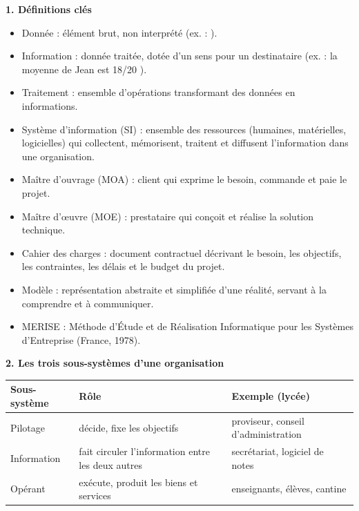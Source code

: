 \documentclass[11pt]{article}
\newcommand{\cle}[1]{{\popxbold\color{popdark}#1}}
\begin{document}
\begin{bilan}
\textbf{1. D\'efinitions cl\'es}
\begin{itemize}
  \item \cle{Donn\'ee} : \'el\'ement brut, non interpr\'et\'e (ex. :  \fg{}).
  \item \cle{Information} : donn\'ee trait\'ee, dot\'ee d'un sens pour un destinataire (ex. : \og la moyenne de Jean est 18/20 \fg{}).
  \item \cle{Traitement} : ensemble d'op\'erations transformant des donn\'ees en informations.
  \item \cle{Syst\`eme d'information (SI)} : ensemble des ressources (humaines, mat\'erielles, logicielles) qui collectent, m\'emorisent, traitent et diffusent l'information dans une organisation.
  \item \cle{Ma\^itre d'ouvrage (MOA)} : client qui exprime le besoin, commande et paie le projet.
  \item \cle{Ma\^itre d'\oe uvre (MOE)} : prestataire qui con\c{c}oit et r\'ealise la solution technique.
  \item \cle{Cahier des charges} : document contractuel d\'ecrivant le besoin, les objectifs, les contraintes, les d\'elais et le budget du projet.
  \item \cle{Mod\`ele} : repr\'esentation abstraite et simplifi\'ee d'une r\'ealit\'e, servant \`a la comprendre et \`a communiquer.
  \item \cle{MERISE} : M\'ethode d'\'Etude et de R\'ealisation Informatique pour les Syst\`emes d'Entreprise (France, 1978).
\end{itemize}

\textbf{2. Les trois sous-syst\`emes d'une organisation}
\begin{center}
\begin{tabularx}{\linewidth}{|l|X|X|}
\hline
\rowcolor{popblueL} \textbf{Sous-syst\`eme} & \textbf{R\^ole} & \textbf{Exemple (lyc\'ee)} \\
\hline
Pilotage & d\'ecide, fixe les objectifs & proviseur, conseil d'administration \\
\hline
Information & fait circuler l'information entre les deux autres & secr\'etariat, logiciel de notes \\
\hline
Op\'erant & ex\'ecute, produit les biens et services & enseignants, \'el\`eves, cantine \\
\hline
\end{tabularx}
\end{center}


\end{bilan}
\end{document}
